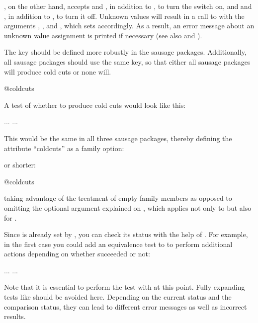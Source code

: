 , on the other hand, accepts  and
, in addition to , to turn the switch on, and
 and , in addition to , to turn it off.
Unknown values will result in a call to
 with the arguments
, , and , which sets
 accordingly. As a result, an error
message about an unknown value assignment is printed if necessary (see also
 and
).
\begin{Example}
  The key  should be defined more robustly in the sausage
  packages. Additionally, all sausage packages should use the same key, so
  that either all sausage packages will produce cold cuts or none will.
\begin{lstcode}
                         {@coldcuts}
\end{lstcode}
  A test of whether to produce cold cuts would look like this:
\begin{lstcode}
  \if@coldcuts
     ...
  \else
     ...
  \fi
\end{lstcode}
  This would be the same in all three sausage packages, thereby
  defining the attribute ``coldcuts'' as a family option:
  or shorter:
\begin{lstcode}
                           {@coldcuts}
\end{lstcode}
  taking advantage of the treatment of empty family members as opposed to
  omitting the optional argument explained on
  , which applies not only
  to  but also for
  .

  Since  is already set by
  , you can check its status with the help of
  . For example, in the first case you
  could add an equivalence test to  to perform additional
  actions depending on whether  succeeded or not:
  \begin{lstcode}
    \ifx\FamilyKeyState\FamilyKeyStateProcessed
        ...
    \else
        ...
    \fi   
  \end{lstcode}
  Note that it is essential to perform the test with
   at this point. Fully expanding tests like  should
  be avoided here. Depending on the current status and the comparison status,
  they can lead to different error messages as well as incorrect results.
\end{Example}%
\EndIndexGroup

